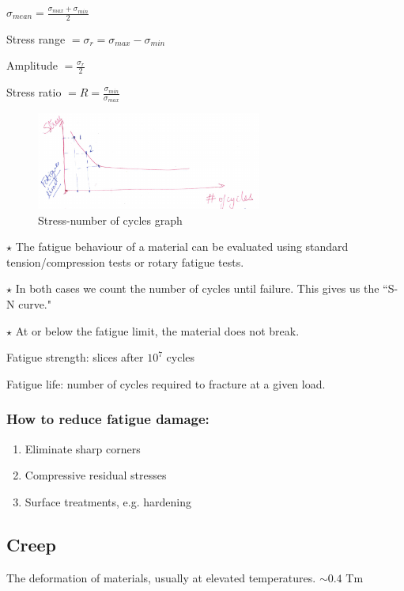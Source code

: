 \documentclass{article}
\begin{document}
$\sigma_{mean} = \frac{\sigma_{max} + \sigma_{min}}{2}$

Stress range $= \sigma_r = \sigma_{max} - \sigma_{min}$

Amplitude $= \frac{\sigma_r}{2}$

Stress ratio $= R = \frac{\sigma_{min}}{\sigma_{max}}$

\begin{figure}[h!]
	\centering
	\includegraphics[width=0.66\textwidth]{assets/d31ee76a.png}
	\caption{Stress-number of cycles graph}
\end{figure}

$\star$ The fatigue behaviour of a material can be evaluated using standard tension/compression tests or rotary fatigue tests.

$\star$ In both cases we count the number of cycles until failure. This gives us the ``S-N curve."

$\star$ At or below the fatigue limit, the material does not break.

Fatigue strength: slices after $10^7$ cycles

Fatigue life: number of cycles required to fracture at a given load.

\subsubsection{How to reduce fatigue damage:}

\begin{enumerate}
    \item Eliminate sharp corners
    \item Compressive residual stresses
    \item Surface treatments, e.g. hardening
\end{enumerate}

\subsection{Creep}

The deformation of materials, usually at elevated temperatures. $\sim 0.4$ Tm
\end{document}
